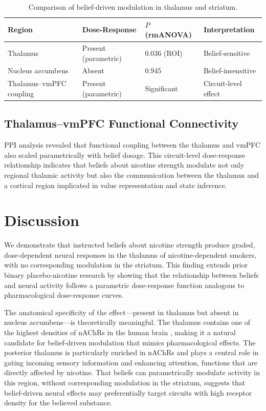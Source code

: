 \documentclass[12pt]{article}
\begin{document}
\begin{table}[ht]
\centering
\caption{Comparison of belief-driven modulation in thalamus and striatum.}
\label{tab:regions}
\begin{tabular}{llll}
\toprule
Region & Dose-Response & $P$ (rmANOVA) & Interpretation \\
\midrule
Thalamus & Present (parametric) & 0.036 (ROI) & Belief-sensitive \\
Nucleus accumbens & Absent & 0.945 & Belief-insensitive \\
Thalamus--vmPFC coupling & Present (parametric) & Significant & Circuit-level effect \\
\bottomrule
\end{tabular}
\end{table}

\subsection{Thalamus--vmPFC Functional Connectivity}

PPI analysis revealed that functional coupling between the thalamus and vmPFC also scaled parametrically with belief dosage. This circuit-level dose-response relationship indicates that beliefs about nicotine strength modulate not only regional thalamic activity but also the communication between the thalamus and a cortical region implicated in value representation and state inference.

\section{Discussion}

We demonstrate that instructed beliefs about nicotine strength produce graded, dose-dependent neural responses in the thalamus of nicotine-dependent smokers, with no corresponding modulation in the striatum. This finding extends prior binary placebo-nicotine research \citep{gu2015belief} by showing that the relationship between beliefs and neural activity follows a parametric dose-response function analogous to pharmacological dose-response curves.

The anatomical specificity of the effect---present in thalamus but absent in nucleus accumbens---is theoretically meaningful. The thalamus contains one of the highest densities of nAChRs in the human brain \citep{cosgrove2009imaging, picciotto2012acetylcholine}, making it a natural candidate for belief-driven modulation that mimics pharmacological effects. The posterior thalamus is particularly enriched in nAChRs and plays a central role in gating incoming sensory information and enhancing attention, functions that are directly affected by nicotine. That beliefs can parametrically modulate activity in this region, without corresponding modulation in the striatum, suggests that belief-driven neural effects may preferentially target circuits with high receptor density for the believed substance.
\end{document}
